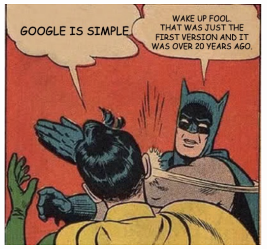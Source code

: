 \documentclass[
10pt, %
aspectratio=169, %
]{beamer}
\begin{document}
	{
		{%
			\includegraphics[width=\paperwidth,height=\paperheight]{meme.png}
		}
		
		
		\begin{frame}
		\end{frame}
	}
	
\end{document}
